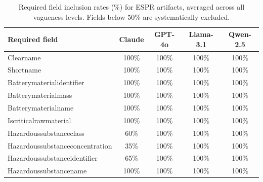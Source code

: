 \begin{table}[t]
  \centering
  \caption{Required field inclusion rates (\%) for ESPR artifacts, averaged across all vagueness levels. Fields below 50\% are systematically excluded.}
  \label{tab:espr_field_inclusion}
  \begin{tabular}{lcccc}
    \toprule
    Required field & Claude & GPT-4o & Llama-3.1 & Qwen-2.5 \\
    \midrule
    Clearname & 100\% & 100\% & 100\% & 100\% \\
    Shortname & 100\% & 100\% & 100\% & 100\% \\
    Batterymaterialidentifier & 100\% & 100\% & 100\% & 100\% \\
    Batterymaterialmass & 100\% & 100\% & 100\% & 100\% \\
    Batterymaterialname & 100\% & 100\% & 100\% & 100\% \\
    Iscriticalrawmaterial & 100\% & 100\% & 100\% & 100\% \\
    Hazardoussubstanceclass & 60\% & 100\% & 100\% & 100\% \\
    Hazardoussubstanceconcentration & 35\% & 100\% & 100\% & 100\% \\
    Hazardoussubstanceidentifier & 65\% & 100\% & 100\% & 100\% \\
    Hazardoussubstancename & 100\% & 100\% & 100\% & 100\% \\
    \bottomrule
  \end{tabular}
\end{table}